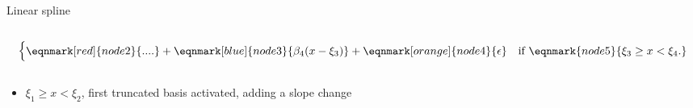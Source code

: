 \documentclass[english]{beamer}
\newcommand{\alertblue}[1]{{\color{blue}#1}}
\begin{document}
\begin{frame}{Linear spline}
\begin{columns}
\begin{column}{0.7\textwidth}
{\begin{equation*}
\begin{cases}
                  \eqnmark[red]{node2}{....} + 
                  \eqnmark[blue]{node3}{\beta_4 (x - \xi_3)} +
                  \eqnmark[orange]{node4}{\epsilon} & \text{if } 
                  \eqnmark{node5}{\xi_3 \geq x < \xi_4.} 
              \end{cases}
          \end{equation*}
          }
        \end{column}
    \end{columns}
    \begin{itemize}
        \item \alertblue{\( \xi_1 \geq x < \xi_2 \)}, first truncated basis \alertblue{activated}, \alert{adding a slope change} 
    \end{itemize} 
\end{frame}
\end{document}
